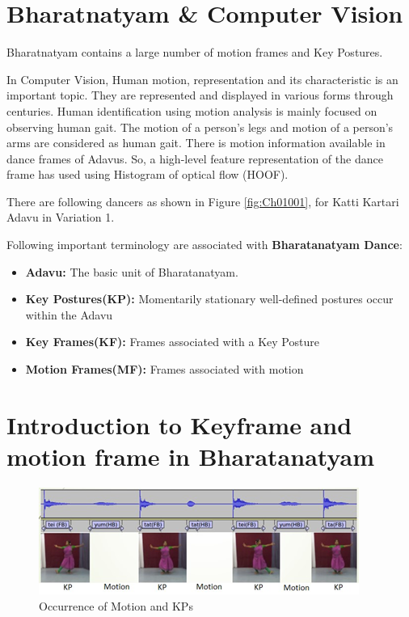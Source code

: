 \section{Bharatnatyam \& Computer Vision}
Bharatnatyam contains a large number of motion frames and Key Postures.

In Computer Vision, Human motion, representation and  its characteristic is an important topic. They are represented and displayed in various forms through centuries.
Human identification using motion analysis is mainly focused on observing human gait.
The motion of a person's legs and motion of a person's arms are considered as human gait.
There is motion information available in dance frames of Adavus. So, 
a high-level feature representation of the dance frame has used using Histogram of optical flow (HOOF).

There are following dancers as shown in Figure \ref{fig:Ch01001}, for Katti Kartari Adavu in Variation 1.


 


Following important terminology are associated with \textbf{Bharatanatyam Dance}:
\begin{itemize}
    \item \textbf{Adavu:} The basic unit of Bharatanatyam.
    \item \textbf{Key Postures(KP):} Momentarily stationary well-defined postures occur within the Adavu
    \item \textbf{Key Frames(KF):} Frames associated with a Key Posture
    \item \textbf{Motion Frames(MF):} Frames associated with motion
\end{itemize}

\section{Introduction to Keyframe and motion frame in Bharatanatyam}


\begin{figure}[H]
  \includegraphics[scale= 1]{./Pictures/motion_fig.png}
  \caption{Occurrence of Motion and KPs}
  \label{fig:Ch1F004}
\end{figure}

